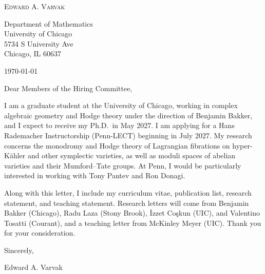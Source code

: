 \documentclass[12pt]{article}
\begin{document}
\begin{center}
  {\Large\textsc{Edward A. Varvak}}\\[10pt]
\end{center}

Department of Mathematics \\
University of Chicago \\
5734 S University Ave \\
Chicago, IL 60637

\today

Dear Members of the Hiring Committee,

I am a graduate student at the University of Chicago, working in complex
algebraic geometry and Hodge theory under the direction of Benjamin Bakker,
and I expect to receive my Ph.D.\ in May 2027. I am applying for a Hans
Rademacher Instructorship (\mbox{Penn-LECT}) beginning in July 2027. My
research concerns the monodromy and Hodge theory of Lagrangian fibrations on
hyper-K\"ahler and other symplectic varieties, as well as moduli spaces of
abelian varieties and their Mumford--Tate groups. At Penn, I would be
particularly interested in working with Tony Pantev and Ron Donagi.

Along with this letter, I include my curriculum vitae, publication list,
research statement, and teaching statement. Research letters will come from
Benjamin Bakker (Chicago), Radu Laza (Stony Brook), \.{I}zzet Co\c{s}kun
(UIC), and Valentino Tosatti (Courant), and a teaching letter from McKinley
Meyer (UIC). Thank you for your consideration.

Sincerely,

Edward A. Varvak
\end{document}
